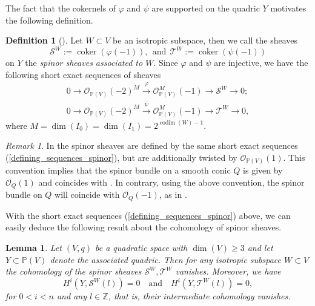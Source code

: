 \documentclass[a4paper, twoside, 11pt]{amsart}
\newtheorem{lemma}[theorem]{Lemma}
\theoremstyle{definition}
\newtheorem{definition}[theorem]{Definition}
\theoremstyle{remark}
\newtheorem{remark}[theorem]{Remark}
\numberwithin{equation}{theorem}
\DeclareMathOperator{\coker}{coker}
\DeclareMathOperator{\codim}{codim}
\begin{document}
\fi
The fact that the cokernels of $\varphi$ and $\psi$ are supported on the quadric $Y$ motivates the following definition.
\begin{definition}[{\cite[§2]{Addington}}]\label{definition_spinor}
    Let $W \subset V$ be an isotropic subspace, then we call the sheaves 
    \begin{equation*}
        \mathcal{S}^W :=\coker(\varphi(-1)), \ \ \text{and} \ \ \mathcal{T}^W:= \coker(\psi(-1))
    \end{equation*}
    on $Y$ the \textit{spinor sheaves associated to $W$}. Since $\varphi$ and $\psi$ are injective, we have the following short exact sequences of sheaves 
    \begin{equation}\label{defining_sequences_spinor}
    \begin{aligned}
        0 \longrightarrow \mathcal{O}_{\mathbb{P}(V)}(-2)^M\overset{\varphi}{\longrightarrow} \mathcal{O}_{\mathbb{P}(V)}^M(-1)\longrightarrow \mathcal{S}^W \longrightarrow 0; \\
        0 \longrightarrow \mathcal{O}_{\mathbb{P}(V)}(-2)^M\overset{\psi}{\longrightarrow} \mathcal{O}_{\mathbb{P}(V)}^M(-1) \longrightarrow \mathcal{T}^W \longrightarrow 0,
    \end{aligned}
    \end{equation} 
    where $M = \dim(I_0) = \dim(I_1) = 2^{\codim(W)-1}$.
\end{definition}
\begin{remark}
    In \cite[§2]{Addington} the spinor sheaves are defined by the same short exact sequences (\ref{defining_sequences_spinor}), but are additionally twisted by $\mathcal{O}_{\mathbb{P}(V)}(1)$. This convention implies that the spinor bundle on a smooth conic $Q$ is given by $\mathcal{O}_Q(1)$ and coincides with \cite{Kapranov_spinors}. In contrary, using the above convention, the spinor bundle on $Q$ will coincide with $\mathcal{O}_Q(-1)$, as in \cite{Ottaviani_spinors}.
\end{remark}
With the short exact sequences (\ref{defining_sequences_spinor}) above, we can easily deduce the following result about the cohomology of spinor sheaves. 
\begin{lemma}\label{cohomology}
    Let $(V,q)$ be a quadratic space with $\dim(V) \geq 3$ and let $Y \subset \mathbb{P}(V)$ denote the associated quadric. Then for any isotropic subspace $W\subset V$ the cohomology of the spinor sheaves $\mathcal{S}^W, \mathcal{T}^W$ vanishes. Moreover, we have 
    \begin{equation*}
        H^i(Y,\mathcal{S}^W(l)) = 0 \quad \text{and} \quad  H^i(Y,\mathcal{T}^W(l)) = 0,
    \end{equation*}
    for $0<i<n$ and any $l \in \mathbb{Z}$, that is, their intermediate cohomology vanishes.
\end{lemma}
\end{document}
